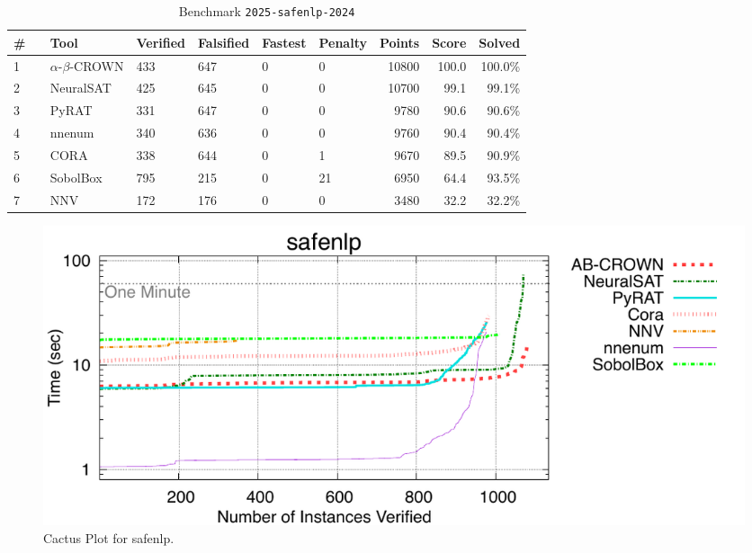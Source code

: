 \begin{table}[h]
\begin{center}
\caption{Benchmark \texttt{2025-safenlp-2024}} \label{tab:cat_2025_safenlp_2024}
{\setlength{\tabcolsep}{2pt}
\begin{tabular}[h]{@{}llllllrrr@{}}
\toprule
\textbf{\# ~} & \textbf{Tool} & \textbf{Verified} & \textbf{Falsified} & \textbf{Fastest} & \textbf{Penalty} & \textbf{Points} & \textbf{Score} & \textbf{Solved}\\
\midrule
1 & $\alpha$-$\beta$-CROWN & 433 & 647 & 0 & 0 & 10800 & 100.0 & 100.0\% \\
2 & NeuralSAT & 425 & 645 & 0 & 0 & 10700 & 99.1 & 99.1\% \\
3 & PyRAT & 331 & 647 & 0 & 0 & 9780 & 90.6 & 90.6\% \\
4 & nnenum & 340 & 636 & 0 & 0 & 9760 & 90.4 & 90.4\% \\
5 & CORA & 338 & 644 & 0 & 1 & 9670 & 89.5 & 90.9\% \\
6 & SobolBox & 795 & 215 & 0 & 21 & 6950 & 64.4 & 93.5\% \\
7 & NNV & 172 & 176 & 0 & 0 & 3480 & 32.2 & 32.2\% \\
\bottomrule
\end{tabular}
}
\end{center}
\end{table}



\begin{figure}[h]
\centerline{\includegraphics[width=\textwidth]{cactus/2025_safenlp_2024.pdf}}
\caption{Cactus Plot for safenlp.}
\label{fig:quantPic}
\end{figure}


\clearpage

